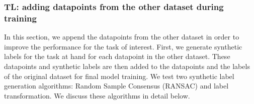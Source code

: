 \documentclass{article}
\begin{document}
\begin{spacing}{0.89}
\subsubsection{TL: adding datapoints from the other dataset during training}
\vspace{-2mm}

In this section, we append the datapoints from the other dataset in order to improve the performance for the task of interest.
First, we generate synthetic labels for the task at hand for each datapoint in the other dataset.
These datapoints and synthetic labels are then added to the datapoints and the labels of the original dataset for final model training.
We test two synthetic label generation algorithms: Random Sample Consensus (RANSAC) and label transformation.
We discuss these algorithms in detail below.
\\


\end{spacing}
\end{document}
